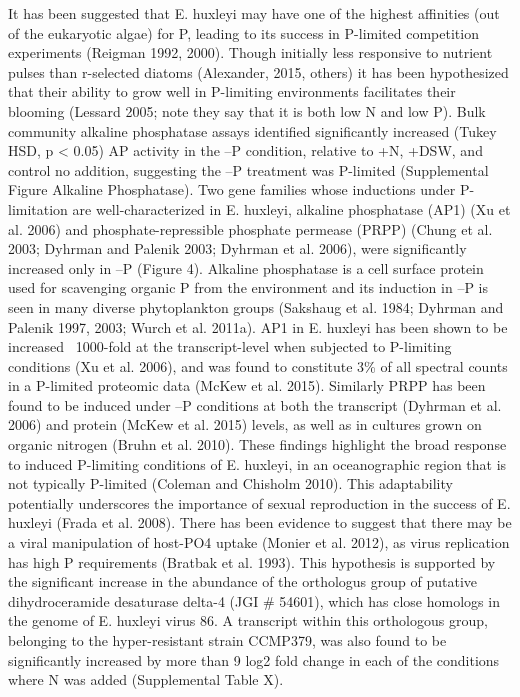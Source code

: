 It has been suggested that E. huxleyi may have one of the highest affinities (out of the eukaryotic algae) for P, leading to its success in P-limited competition experiments (Reigman 1992, 2000). Though initially less responsive to nutrient pulses than r-selected diatoms (Alexander, 2015, others) it has been hypothesized that their ability to grow well in P-limiting environments facilitates their blooming (Lessard 2005; note they say that it is both low N and low P). Bulk community alkaline phosphatase assays identified significantly increased (Tukey HSD, p < 0.05) AP activity in the –P condition, relative to +N, +DSW, and control no addition, suggesting the –P treatment was P-limited (Supplemental Figure Alkaline Phosphatase). Two gene families whose inductions under P-limitation are well-characterized in E. huxleyi, alkaline phosphatase (AP1) (Xu et al. 2006) and phosphate-repressible phosphate permease (PRPP) (Chung et al. 2003; Dyhrman and Palenik 2003; Dyhrman et al. 2006), were significantly increased only in –P (Figure 4). Alkaline phosphatase is a cell surface protein used for scavenging organic P from the environment and its induction in –P is seen in many diverse phytoplankton groups (Sakshaug et al. 1984; Dyhrman and Palenik 1997, 2003; Wurch et al. 2011a). AP1 in E. huxleyi has been shown to be increased ~1000-fold at the transcript-level when subjected to P-limiting conditions (Xu et al. 2006), and was found to constitute 3\% of all spectral counts in a P-limited proteomic data (McKew et al. 2015). Similarly PRPP has been found to be induced under –P conditions at both the transcript (Dyhrman et al. 2006) and protein (McKew et al. 2015) levels, as well as in cultures grown on organic nitrogen (Bruhn et al. 2010). These findings highlight the broad response to induced P-limiting conditions of E. huxleyi, in an oceanographic region that is not typically P-limited (Coleman and Chisholm 2010). This adaptability potentially underscores the importance of sexual reproduction in the success of E. huxleyi (Frada et al. 2008). 
There has been evidence to suggest that there may be a viral manipulation of host-PO4 uptake (Monier et al. 2012), as virus replication has high P requirements (Bratbak et al. 1993). This hypothesis is supported by the significant increase in the abundance of the orthologus group of putative dihydroceramide desaturase delta-4 (JGI \# 54601), which has close homologs in the genome of E. huxleyi virus 86.  A transcript within this orthologous group, belonging to the hyper-resistant strain CCMP379, was also found to be significantly increased by more than 9 log2 fold change in each of the conditions where N was added (Supplemental Table X).
